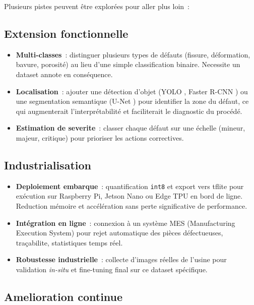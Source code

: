\documentclass[12pt,a4paper,openany]{report}
\begin{document}
Plusieurs pistes peuvent être explorées pour aller plus loin~:

\subsection{Extension fonctionnelle}

\begin{itemize}
    \item \textbf{Multi-classes}~: distinguer plusieurs types de défauts (fissure, déformation, bavure, porosité) au lieu d'une simple classification binaire. Necessite un dataset annote en conséquence.
    \item \textbf{Localisation}~: ajouter une détection d'objet (YOLO \cite{redmon2016}, Faster R-CNN \cite{ren2015}) ou une segmentation semantique (U-Net \cite{ronneberger2015}) pour identifier la zone du défaut, ce qui augmenterait l'interprétabilité et faciliterait le diagnostic du procédé.
    \item \textbf{Estimation de severite}~: classer chaque défaut sur une échelle (mineur, majeur, critique) pour prioriser les actions correctives.
\end{itemize}

\subsection{Industrialisation}

\begin{itemize}
    \item \textbf{Deploiement embarque}~: quantification \texttt{int8} et export vers \gls{tflite} pour exécution sur Raspberry Pi, Jetson Nano ou Edge TPU en bord de ligne. Reduction mémoire et accélération sans perte significative de performance.
    \item \textbf{Intégration en ligne}~: connexion à un système MES (Manufacturing Execution System) pour rejet automatique des pièces défectueuses, traçabilite, statistiques temps réel.
    \item \textbf{Robustesse industrielle}~: collecte d'images réelles de l'usine pour validation \emph{in-situ} et fine-tuning final sur ce dataset spécifique.
\end{itemize}

\subsection{Amelioration continue}
\end{document}
